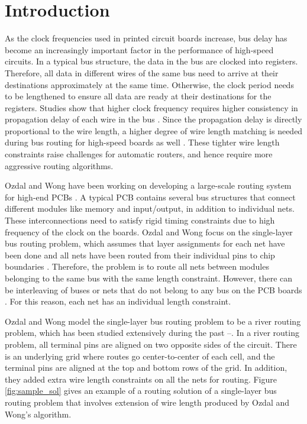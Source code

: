 \chapter{Introduction}\label{chap-intro}
As the clock frequencies used in printed circuit boards increase, bus delay has become an increasingly important factor in the performance of high-speed circuits. In a typical bus structure, the data in the bus are clocked into registers. Therefore, all data in different wires of the same bus need to arrive at their destinations approximately at the same time. Otherwise, the clock period needs to be lengthened to ensure all data are ready at their destinations for the registers. Studies show that higher clock frequency requires higher consistency in propagation delay of each wire in the bus \cite{IEEEexample:pcb_bus}. Since the propagation delay is directly proportional to the wire length, a higher degree of wire length matching is needed during bus routing for high-speed boards as well \cite{IEEEexample:lengthmatch}. These tighter wire length constraints raise challenges for automatic routers, and hence require more aggressive routing algorithms.

Ozdal and Wong have been working on developing a large-scale routing system for high-end PCBs \cite{IEEEexample:ozdal_wong}. A typical PCB contains several bus structures that connect different modules like memory and input/output, in addition to individual nets. These interconnections need to satisfy rigid timing constraints due to high frequency of the clock on the boards. Ozdal and Wong focus on the single-layer bus routing problem, which assumes that layer assignments for each net have been done and all nets have been routed from their individual pins to chip boundaries \cite{IEEEexample:ozdal_wong}. Therefore, the problem is to route all nets between modules belonging to the same bus with the same length constraint. However, there can be interleaving of buses or nets that do not belong to any bus on the PCB boards \cite{IEEEexample:ozdal_wong}. For this reason, each net has an individual length constraint.

Ozdal and Wong model the single-layer bus routing problem to be a river routing problem, which has been studied extensively during the past \cite{IEEEexample:river}--\nocite{IEEEexample:river2}\cite{IEEEexample:river3}. In a river routing problem, all terminal pins are aligned on two opposite sides of the circuit. There is an underlying grid where routes go center-to-center of each cell, and the terminal pins are aligned at the top and bottom rows of the grid. In addition, they added extra wire length constraints on all the nets for routing. Figure \ref{fig:sample_sol} gives an example of a routing solution of a single-layer bus routing problem that involves extension of wire length produced by Ozdal and Wong's algorithm. 

